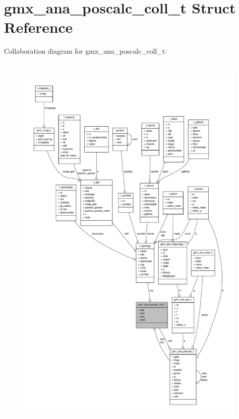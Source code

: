 \hypertarget{structgmx__ana__poscalc__coll__t}{\section{gmx\-\_\-ana\-\_\-poscalc\-\_\-coll\-\_\-t \-Struct \-Reference}
\label{structgmx__ana__poscalc__coll__t}
}


\-Collaboration diagram for gmx\-\_\-ana\-\_\-poscalc\-\_\-coll\-\_\-t\-:
\nopagebreak
\begin{figure}[H]
\begin{center}
\leavevmode
\includegraphics[height=550pt]{structgmx__ana__poscalc__coll__t__coll__graph}
\end{center}
\end{figure}
